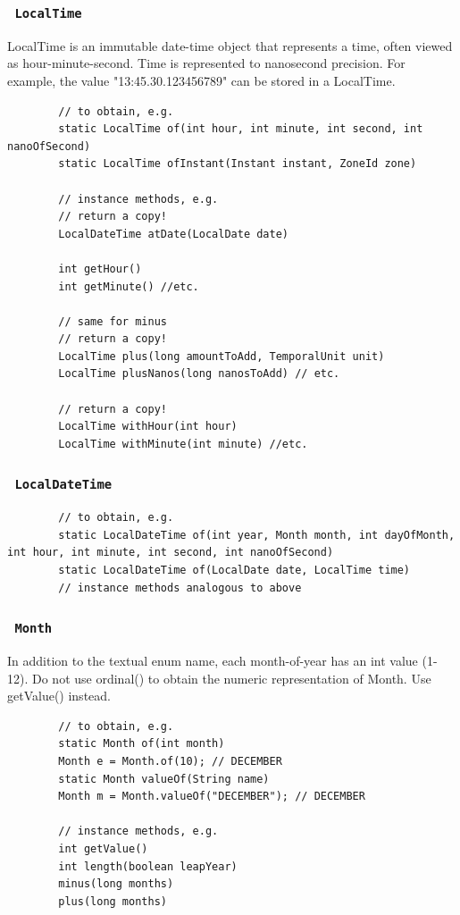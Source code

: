 \documentclass{scrartcl}
\begin{document}
\subsubsection{\lstinline$ LocalTime $}

    LocalTime is an immutable date-time object that represents a time, often viewed as hour-minute-second. Time is represented to nanosecond precision. For example, the value "13:45.30.123456789" can be stored in a LocalTime.

    \begin{lstlisting}
        // to obtain, e.g.
        static LocalTime of(int hour, int minute, int second, int nanoOfSecond)
        static LocalTime ofInstant(Instant instant, ZoneId zone)

        // instance methods, e.g.
        // return a copy!
        LocalDateTime atDate(LocalDate date)

        int getHour()
        int getMinute() //etc.

        // same for minus
        // return a copy!
        LocalTime plus(long amountToAdd, TemporalUnit unit)
        LocalTime plusNanos(long nanosToAdd) // etc.

        // return a copy!
        LocalTime withHour(int hour)
        LocalTime withMinute(int minute) //etc.
        \end{lstlisting}

\subsubsection{\lstinline$ LocalDateTime $}

    \begin{lstlisting}
        // to obtain, e.g.
        static LocalDateTime of(int year, Month month, int dayOfMonth, int hour, int minute, int second, int nanoOfSecond)
        static LocalDateTime of(LocalDate date, LocalTime time)
        // instance methods analogous to above
    \end{lstlisting}

\subsubsection{\lstinline$ Month $}

    In addition to the textual enum name, each month-of-year has an int value (1-12).
    Do not use ordinal() to obtain the numeric representation of Month. Use getValue() instead.

    \begin{lstlisting}
        // to obtain, e.g.
        static Month of(int month)
        Month e = Month.of(10); // DECEMBER
        static Month valueOf(String name)
        Month m = Month.valueOf("DECEMBER"); // DECEMBER

        // instance methods, e.g.
        int getValue()
        int length(boolean leapYear)
        minus(long months)
        plus(long months)
    \end{lstlisting}
\end{document}
